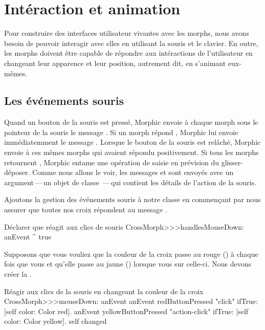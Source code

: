\documentclass[a4paper,10pt,twoside]{book}
\begin{document}
\section{Intéraction et animation}

Pour construire des interfaces utilisateur vivantes avec les morphs,
nous avons besoin de pouvoir interagir avec elles en utilisant la
souris et le clavier.
En outre, les morphs doivent être capable de répondre aux
intéractions de l'utilisateur en changeant leur apparence et leur
position, autrement dit, en s'animant eux-mêmes.

\subsection{Les événements souris}

Quand un bouton de la souris est pressé, Morphic envoie à chaque
morph sous le pointeur de la souris le message
. Si un morph répond , Morphic lui
envoie immédiatemment le message . Lorsque
le bouton de la souris est relâché, Morphic envoie
  à ces mêmes morphs qui avaient répondu
positivement. Si tous les morphs retournent , Morphic entame
une opération de
saisie en prévision du glisser-déposer.
Comme nous allons le voir, les messages  et 
sont envoyés avec un argument\,---\,un objet de classe
\,---\,qui contient les détails de l'action de la souris.

Ajoutons la gestion des événements souris à notre classe
 en commençant par nous assurer que toutes nos
croix répondent  au message .

\begin{method}{Déclarer que  réagit aux clics de souris}
CrossMorph>>>handlesMouseDown: anEvent
	^ true
\end{method}

Supposons que vous vouliez que la couleur de la croix passe au rouge
()
à chaque fois que vous \clickz et qu'elle passe au jaune
()
lorsque vous \actclickz sur celle-ci. 
Nous devons créer la .

\begin{method}[mouseDown]{Réagir aux clics de la souris en changeant la couleur de la croix}
CrossMorph>>>mouseDown: anEvent
	anEvent redButtonPressed "click"
		ifTrue: [self color: Color red].
	anEvent yellowButtonPressed "action-click"
		ifTrue: [self color: Color yellow].
	self changed
\end{method}
\end{document}
